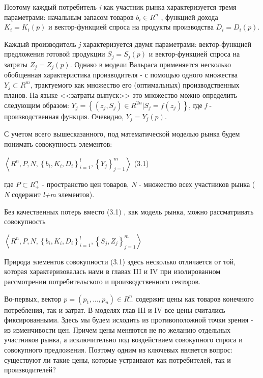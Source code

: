 \documentclass[12pt, 4paper]{book}
\begin{document}
{Поэтому каждый потребитель \textit{i} как участник рынка характеризуется тремя параметрами: начальным запасом товаров $b_i \in R^{n}$ , функцией дохода $K_i = K_i(p)$ и вектор-функцией спроса на продукты производства $D_i=D_i(p)$.
\par

Каждый производитель \textit{j} характеризуется двумя параметрами: вектор-функцией предложения готовой продукции $S_j=S_j(p)$ и вектор-функцией спроса на затраты $Z_j = Z_j(p)$. Однако в модели Вальраса применяется несколько обобщенная характеристика производителя - с помощью одного множества $Y_j \subset R^{m}$, трактуемого как множество его (оптимальных) производственных планов. На языке <<затраты-выпуск>> это множество можно определить следующим образом: $Y_j = \left\{ (z_j,S_j) \in R^{2n} | S_j = f(z_j)\right\}$, где \textit{f} - производственная функция. Очевидно, $Y_j = Y_j(p)$.
\par

С учетом всего вышесказанного, под математической моделью рынка будем понимать совокупность элементов:
\par

\begin{center}
$\left\langle R^n,P,N,\left\{ b_i,K_i,D_i\right\}_{i=1}^{l},\left\{Y_j\right\}_{j=1}^{m} \right\rangle$ (3.1)
\end{center}
где $P \subset R_{+}^{n}$ - пространство цен товаров, \textit{N} - множество всех участников рынка ( \textit{N} содержит \textit{l+m} элементов).
\par

Без качественных потерь вместо (3.1) , как модель рынка, можно рассматривать совокупность
\begin{center}
$\left\langle R^n,P,N,\left\{ b_i,K_i,D_i\right\}_{i=1}^{l},\left\{S_j , Z_j \right\}_{j=1}^{m} \right\rangle$ 
\end{center}
\par

Природа элементов совокупности (3.1) здесь несколько отличается от той, которая характеризовалась нами в главах III и IV при изолированном рассмотрении потребительского и производственного секторов.
\par

Во-первых, вектор $p=(p_1,...,p_n)\in R_{+}^{n}$ содержит цены как товаров конечного потребления, так и затрат. В моделях глав III и IV все цены считались фиксированными. Здесь мы будем исходить из противоположной точки зрения - из изменчивости цен. Причем цены меняются не по желанию отдельных участников рынка, а исключительно под воздействием совокупного спроса и совокупного предложения. Поэтому одним из ключевых является вопрос: существуют ли такие цены, которые устраивают как потребителей, так и производителей?
\par

}
\end{document}
